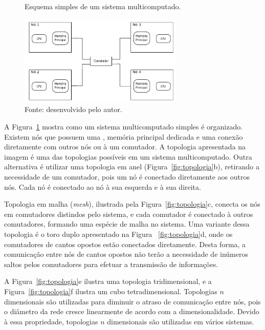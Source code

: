 \begin{figure}[t]
	\centering
    \caption{Esquema simples de um sistema multicomputado.}
        \includegraphics[width=0.7\textwidth]{figs/multicomp.pdf}
        \caption*{Fonte: desenvolvido pelo autor.}
        \label{fig:multicomputado}
\end{figure}



A Figura~\ref{fig:multicomputado} mostra como um sistema multicomputado simples é
organizado. Existem nós que possuem uma \cpu, memória principal dedicada e uma
conexão diretamente com outros nós ou à um comutador. A topologia apresentada na
imagem é uma das topologias possíveis em um sistema multicomputado. Outra
alternativa é utilizar uma topologia em anel (Figura~\ref{fig:topologia}b), retirando a necessidade de um
comutador, pois um nó é conectado diretamente aos outros nós. Cada nó é
conectado ao nó à sua esquerda e à sua direita.

Topologia em malha (\textit{mesh}), ilustrada pela Figura~\ref{fig:topologia}c, conecta os nós
em comutadores distindos pelo sistema, e cada comutador é conectado à outros
comutadores, formando uma espécie de malha no sistema. Uma variante dessa
topologia é o toro duplo apresentado na Figura ~\ref{fig:topologia}d, onde os
comutadores de cantos opostos estão conectados diretamente. Desta forma, a
comunicação entre nós de cantos opostos não terão a necessidade de inúmeros
saltos pelos comutadores para efetuar a transmissão de informações.

A Figura~\ref{fig:topologia}e ilustra uma topologia tridimensional, e a
Figura~\ref{fig:topologia}f ilustra um cubo tetradimensional. Topologias
$n$ dimensionais são utilizadas para diminuir o atraso de comunicação entre nós,
pois o diâmetro da rede cresce linearmente de acordo com a dimensionalidade.
Devido à essa propriedade, topologias $n$ dimensionais são utilizadas em
vários sistemas.




